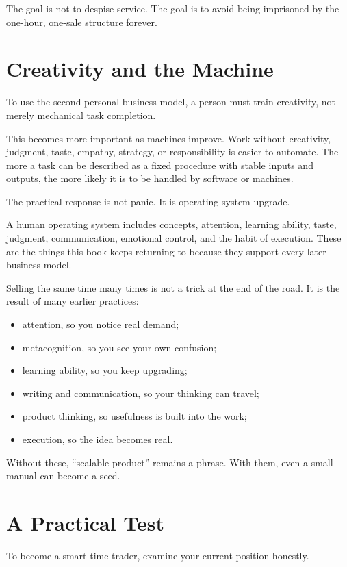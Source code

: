 The goal is not to despise service. The goal is to avoid being imprisoned by the one-hour, one-sale structure forever.

\section*{Creativity and the Machine}

To use the second personal business model, a person must train creativity, not merely mechanical task completion.

This becomes more important as machines improve. Work without creativity, judgment, taste, empathy, strategy, or responsibility is easier to automate. The more a task can be described as a fixed procedure with stable inputs and outputs, the more likely it is to be handled by software or machines.

The practical response is not panic. It is operating-system upgrade.

A human operating system includes concepts, attention, learning ability, taste, judgment, communication, emotional control, and the habit of execution. These are the things this book keeps returning to because they support every later business model.

Selling the same time many times is not a trick at the end of the road. It is the result of many earlier practices:

\begin{itemize}
\item attention, so you notice real demand;
\item metacognition, so you see your own confusion;
\item learning ability, so you keep upgrading;
\item writing and communication, so your thinking can travel;
\item product thinking, so usefulness is built into the work;
\item execution, so the idea becomes real.
\end{itemize}

Without these, ``scalable product'' remains a phrase. With them, even a small manual can become a seed.

\section*{A Practical Test}

To become a smart time trader, examine your current position honestly.

